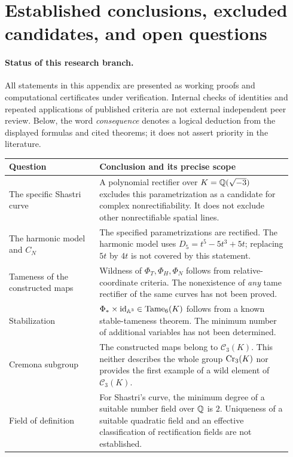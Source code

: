 \section{Established conclusions, excluded candidates, and open questions}
\label{sec:status-literature}

\paragraph{Status of this research branch.}
All statements in this appendix are presented as working proofs and
computational certificates under verification. Internal checks of identities
and repeated applications of published criteria are not external independent
peer review. Below, the word \emph{consequence} denotes a logical deduction
from the displayed formulas and cited theorems; it does not assert priority
in the literature.

\begin{center}
\small
\begin{tabular}{@{}p{0.30\linewidth}p{0.64\linewidth}@{}}
\toprule
Question & Conclusion and its precise scope\\
\midrule
The specific Shastri curve &
A polynomial rectifier over $K={\mathbb Q}(\sqrt{-3})$ excludes this
parametrization as a candidate for complex nonrectifiability. It does
not exclude other nonrectifiable spatial lines.\\[4pt]
The harmonic model and $C_N$ &
The specified parametrizations are rectified. The harmonic model
uses $D_5=t^5-5t^3+5t$; replacing $5t$ by $4t$ is not covered
by this statement.\\[4pt]
Tameness of the constructed maps &
Wildness of $\Phi_T,\Phi_H,\Phi_N$ follows from relative-coordinate
criteria. The nonexistence of \emph{any} tame rectifier of the same
curves has not been proved.\\[4pt]
Stabilization &
$\Phi_\ast\times\mathrm{id}_{{\mathbb A}^3}\in\operatorname{Tame}_6(K)$ follows from a known
stable-tameness theorem. The minimum number of additional variables
has not been determined.\\[4pt]
Cremona subgroup &
The constructed maps belong to $\mathcal C_3(K)$.
This neither describes the whole group $\operatorname{Cr}_3(K)$ nor provides the
first example of a wild element of $\mathcal C_3(K)$.\\[4pt]
Field of definition &
For Shastri's curve, the minimum degree of a suitable number field
over ${\mathbb Q}$ is $2$. Uniqueness of a suitable quadratic field and an
effective classification of rectification fields are not established.\\
\bottomrule
\end{tabular}
\end{center}

